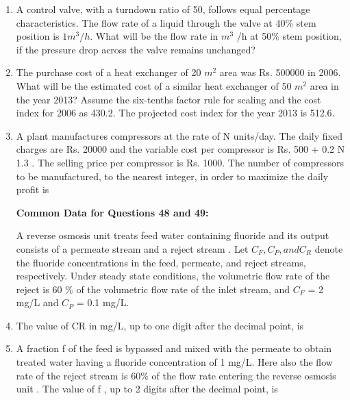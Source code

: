 \documentclass[journal,12pt,onecolumn]{IEEEtran}
\theoremstyle{remark}
\begin{document}
\begin{enumerate}
 \item A control valve, with a turndown ratio of 50, follows equal percentage characteristics. The flow rate
 of a liquid through the valve at 40\% stem position is $1 m^3/h$. What will be the flow rate in $m^3$
 /h at 50\% stem position, if the pressure drop across the valve remains unchanged?   \underline{\hspace{2cm}}
 
 \item The purchase cost of a heat exchanger of 20 $m^2$ 
 area was Rs. 500000 in 2006. What will be the 
 estimated cost  of a similar heat exchanger of 50 $m^2$
 area in the year 2013? Assume the six-tenths factor rule for scaling and the cost index for 2006 as 430.2. The
 projected cost index for the year 2013 is 512.6.  \underline{\hspace{2cm}}
 
 \item A plant manufactures compressors at the rate of N units/day. The daily fixed charges are Rs. 20000
 and the variable cost per compressor is Rs. 500 + 0.2 N
 1.3
 . The selling price per compressor is
 Rs. 1000. The number of compressors to be manufactured, to the nearest integer, in order to
 maximize the daily profit is  \underline{\hspace{2cm}}
 
  
 \textbf{Common Data for Questions 48 and 49:}
 
 A reverse osmosis unit treats feed water  containing fluoride and its output consists of a permeate stream
  and a reject stream . Let $C_F, C_P, and C_R$ denote the fluoride concentrations in the feed, permeate, and
 reject streams, respectively. Under steady state conditions, the volumetric flow rate of the reject is 60 \% of
 the volumetric flow rate of the inlet stream, and $C_F$ = 2 mg/L and $C_P$ = 0.1 mg/L. 
 
 \item The value of CR in mg/L, up to one digit after the decimal point, is \underline{\hspace{2cm}}
 
\item A fraction f of the feed is bypassed and mixed with the permeate to obtain treated water having a
fluoride concentration of 1 mg/L. Here also the flow rate of the reject stream is 60\% of the flow rate
entering the reverse osmosis unit . The value of f , up to 2 digits after the decimal
point, is \underline{\hspace{2cm}}


\end{enumerate}
\end{document}
